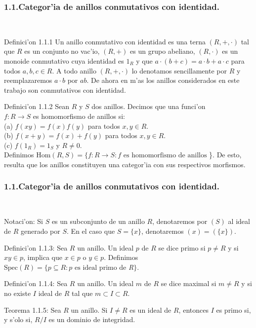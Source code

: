 \documentclass[10pt]{beamer}
\renewcommand{\ri}{\textit{R}}
\renewcommand{\Sp}{\text{Spec}}
\begin{document}
\begin{frame}
\frametitle{1.1.Categor'ia de anillos conmutativos con identidad.}\\
\begin{block}{Definici'on 1.1.1}
Un anillo conmutativo con identidad es una terna $(\ri,+,\cdot)$ tal que $\ri$ es un conjunto no vac'io, $(\ri,+)$ es un grupo abeliano, $(\ri, \cdot)$ es un monoide conmutativo cuya identidad es $1_{\ri}$ y que $a \cdot (b+c)= a \cdot b + a \cdot c$ para todos $a,b,c \in \ri$. A todo anillo $(\ri,+,\cdot)$ lo denotamos sencillamente por $\ri$ y reemplazaremos $a \cdot b$ por $ab$. De ahora en m'as los anillos considerados en este trabajo son conmutativos con identidad.
\end{block}
\begin{block}{Definici'on 1.1.2}
 Sean $R$ y $S$ dos anillos. Decimos que una funci'on\\
 $f:R\rightarrow S$ es homomorfismo de anillos si:\\
(a) $f(xy)=f(x)f(y)$ para todos $x,y \in R$.\\
(b) $f(x+y)=f(x)+f(y)$ para todos $x,y \in R$.\\
(c) $f(1_{R})=1_{S}$ y $R \not = {0}$.\\
Definimos $\text{Hom} (R,S)=\{ f:R \rightarrow S: f\text{ es homomorfismo de anillos}$ \}. De esto, resulta que los anillos constituyen una categor'ia con sus respectivos morfismos.\\
\end{block}
\end{frame}



\begin{frame}
\frametitle{1.1.Categor'ia de anillos conmutativos con identidad.}\\
\begin{block}{Notaci'on:}
 Si $S$ es un subconjunto de un anillo $\ri$, denotaremos por $(S)$ al ideal de $\ri$ generado por $S$. En el caso que $S=\{x\}$, denotaremos $(x)=(\{x\})$.
\end{block}
\begin{block}{Definici'on 1.1.3:}
Sea $R$ un anillo. Un ideal $p$ de $R$ se dice primo si $p \not = R$ y si $xy \in p$, implica que $x \in p$ o $y \in p$. Definimos $\Sp (R)=\{p\subseteq R :p \text{ es ideal primo de }$\ri$\}$.\\
\end{block}
\begin{block}{Definici'on 1.1.4:}
Sea $R$ un anillo. Un ideal $m$ de $R$ se dice maximal si $m \not = R$ y si no existe $I$ ideal de $R$ tal que $ m \subset I \subset R$.
\end{block}
\begin{block}{Teorema 1.1.5:} 
Sea $R$ un anillo. Si $I \not = R$ es un ideal de $R$, entonces $I$ es primo si, y s'olo si, $R/I$ es un dominio de integridad.\\
\end{block}

\end{frame}
\end{document}
